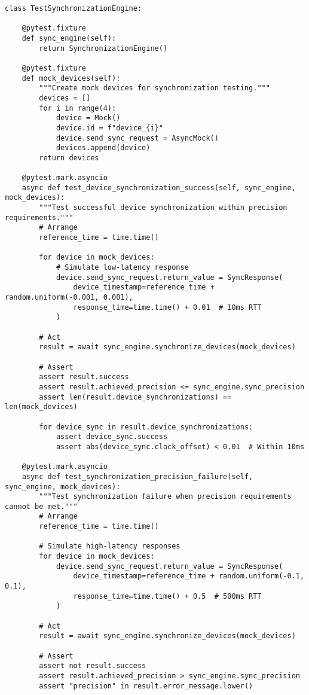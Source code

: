 \documentclass[12pt,a4paper]{report}
\begin{document}
\begin{verbatim}
class TestSynchronizationEngine:

    @pytest.fixture
    def sync_engine(self):
        return SynchronizationEngine()

    @pytest.fixture
    def mock_devices(self):
        """Create mock devices for synchronization testing."""
        devices = []
        for i in range(4):
            device = Mock()
            device.id = f"device_{i}"
            device.send_sync_request = AsyncMock()
            devices.append(device)
        return devices

    @pytest.mark.asyncio
    async def test_device_synchronization_success(self, sync_engine, mock_devices):
        """Test successful device synchronization within precision requirements."""
        # Arrange
        reference_time = time.time()

        for device in mock_devices:
            # Simulate low-latency response
            device.send_sync_request.return_value = SyncResponse(
                device_timestamp=reference_time + random.uniform(-0.001, 0.001),
                response_time=time.time() + 0.01  # 10ms RTT
            )

        # Act
        result = await sync_engine.synchronize_devices(mock_devices)

        # Assert
        assert result.success
        assert result.achieved_precision <= sync_engine.sync_precision
        assert len(result.device_synchronizations) == len(mock_devices)

        for device_sync in result.device_synchronizations:
            assert device_sync.success
            assert abs(device_sync.clock_offset) < 0.01  # Within 10ms

    @pytest.mark.asyncio
    async def test_synchronization_precision_failure(self, sync_engine, mock_devices):
        """Test synchronization failure when precision requirements cannot be met."""
        # Arrange
        reference_time = time.time()

        # Simulate high-latency responses
        for device in mock_devices:
            device.send_sync_request.return_value = SyncResponse(
                device_timestamp=reference_time + random.uniform(-0.1, 0.1),
                response_time=time.time() + 0.5  # 500ms RTT
            )

        # Act
        result = await sync_engine.synchronize_devices(mock_devices)

        # Assert
        assert not result.success
        assert result.achieved_precision > sync_engine.sync_precision
        assert "precision" in result.error_message.lower()


\end{verbatim}
\end{document}
